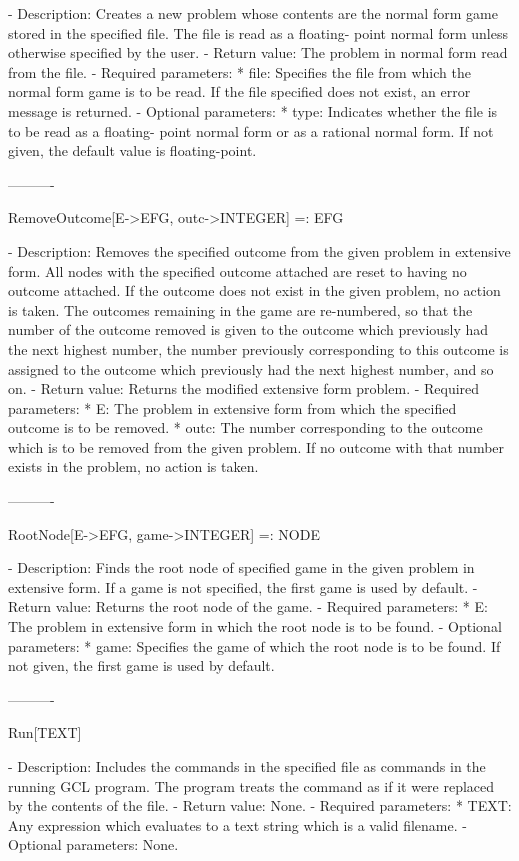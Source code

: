 \begin{itemize}
   -	Description:  Creates a new problem whose contents are the normal form
	game stored in the specified file.  The file is read as a floating-
	point normal form unless otherwise specified by the user.
   -	Return value:  The problem in normal form read from the file.
   -	Required parameters:
	  *  file:  Specifies the file from which the normal form game is to be
		read.  If the file specified does not exist, an error message
		is returned.
   -	Optional parameters:
	  *  type:  Indicates whether the file is to be read as a floating-
		point normal form or as a rational normal form.  If not given,
		the default value is floating-point.

----------

RemoveOutcome[E->EFG, outc->INTEGER] =: EFG

   -	Description:  Removes the specified outcome from the given problem in
	extensive form.  All nodes with the specified outcome attached are 
	reset to having no outcome attached.  If the outcome does not exist in
	the given problem, no action is taken.  The outcomes remaining in the 
	game are re-numbered, so that the number of the outcome removed is 
	given to the outcome which previously had the next highest number, the
	number previously corresponding to this outcome is assigned to the
	outcome which previously had the next highest number, and so on.  
   -	Return value:  Returns the modified extensive form problem.
   -	Required parameters:
	  *  E:  The problem in extensive form from which the specified outcome
		is to be removed.
	  *  outc:  The number corresponding to the outcome which is to be 
		removed from the given problem.  If no outcome with that number
		exists in the problem, no action is taken.

----------

RootNode[E->EFG, {game->INTEGER}] =: NODE

   -	Description:  Finds the root node of specified game in the given 
	problem in extensive form.  If a game is not specified, the first game 
	is used by default.
   -	Return value:  Returns the root node of the game.
   -	Required parameters:
	  *  E:  The problem in extensive form in which the root node is to be
		found.
   -	Optional parameters:
	  *  game:  Specifies the game of which the root node is to be found.
		If not given, the first game is used by default.

----------

Run[TEXT]

   -	Description:  Includes the commands in the specified file as commands 
	in the running GCL program.  The program treats the command as if it 
	were replaced by the contents of the file.
   -	Return value:  None.
   -	Required parameters:
	  *  TEXT:  Any expression which evaluates to a text string which is a
		valid filename.
   -	Optional parameters:  None.


\end{itemize}

